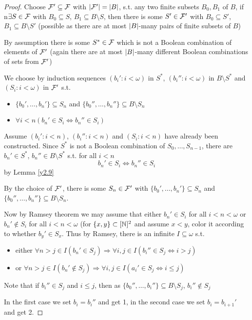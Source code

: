 \documentclass[11pt]{article}
\begin{document}
\begin{proof}
Choose \(\mathcal{F}'\subseteq\mathcal{F}\) with \(\abs{\calf'}=\abs{B}\), s.t. any two finite subsets \(B_0,B_1\) of \(B\),
if n\(\exists S\in\mathcal{F}\) with \(B_0\subseteq S\), \(B_1\subseteq B\setminus S\), then there is some \(S'\in\mathcal{F}'\)
with \(B_0\subseteq S'\), \(B_1\subseteq B\setminus S'\) (possible as there are at most \(\abs{B}\)-many pairs of finite
subsets of \(B\))

By assumption there is some \(S^*\in\mathcal{F}\) which is not a Boolean combination of elements of \(\mathcal{F}'\)
(again there are at most \(\abs{B}\)-many different Boolean combinations of sets from \(\mathcal{F}'\))

We choose by induction sequences \((b_i':i<\omega)\) in \(S^*\), \((b_i'':i<\omega)\) in \(B\setminus S^*\)
and \((S_i:i<\omega)\) in \(\mathcal{F}'\) s.t.
\begin{itemize}
\item \(\{b_0',\dots,b_n'\}\subseteq S_n\) and \(\{b_0'',\dots,b_n''\}\subseteq B\setminus S_n\)
\item \(\forall i<n(b_n'\in S_i\Leftrightarrow b_n''\in S_i)\)
\end{itemize}


Assume \((b_i':i<n)\), \((b_i'':i<n)\) and \((S_i:i<n)\) have already been constructed.
Since \(S^*\) is not a Boolean combination of \(S_0,\dots,S_{n-1}\), there
are \(b_n'\in S^*\), \(b_n''\in B\setminus S^*\) s.t. for all \(i<n\)
\begin{equation*}
b_n'\in S_i\Leftrightarrow b_n''\in S_i
\end{equation*}
by Lemma \ref{y2.9}

By the choice of \(\mathcal{F}'\), there is some \(S_n\in\mathcal{F}'\) with \(\{b_0',\dots,b_n'\}\subseteq S_n\)
and \(\{b_0'',\dots,b_n''\}\subseteq B\setminus S_n\).



Now by Ramsey theorem we may assume that either \(b_n'\in S_i\) for all \(i<n<\omega\) or \(b_n'\notin S_i\)
for all \(i<n<\omega\) (for \(\{x,y\}\subset[\mathbb{N}]^2\) and assume \(x<y\), color it according to
whether \(b_y'\in S_x\). Thus by Ramsey, there is an infinite \(I\subseteq\omega\) s.t.
\begin{itemize}
\item either \(\forall n>j\in I(b_n'\in S_j) \Rightarrow \forall i,j\in I(b_i''\in S_j\Leftrightarrow i>j)\)
\item or \(\forall n>j\in I(b_n'\notin S_j) \Rightarrow \forall i,j\in I(a_i'\in S_j\Leftrightarrow i\le j)\)
\end{itemize}


Note that if \(b_i''\in S_j\) and \(i\le j\), then as \(\{b_0'',\dots,b_i''\}\subseteq B\setminus S_j\), \(b_i''\notin S_j\)

In the first case we set \(b_i=b_i''\) and get 1, in the
second case we set \(b_i=b_{i+1}'\) and get 2.
\end{proof}
\end{document}

